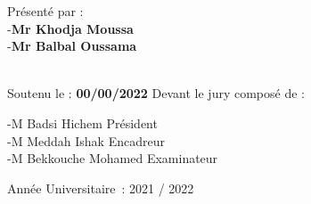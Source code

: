 \begin{titlepage}
\begin{center}
        \vspace{0.5cm}
        
        Présenté par : \\
        -\textbf{Mr Khodja Moussa} \\
        -\textbf{Mr Balbal Oussama} \\\

        
        \vspace{0.5cm}

        Soutenu le : \textbf{00/00/2022} Devant le jury composé de :\\
    \end{center}
        -M  Badsi Hichem Président \\
        -M  Meddah Ishak Encadreur \\
        -M  Bekkouche Mohamed Examinateur \\
    
    \begin{center}
        \vfill
        Année Universitaire : 2021 / 2022
    \end{center}
\end{titlepage}
